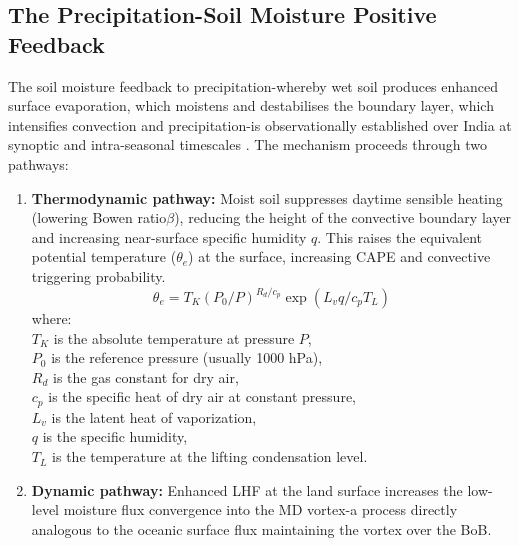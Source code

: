\subsection{The Precipitation-Soil Moisture Positive Feedback}
\label{subsec:precip_sm_feedback}

The soil moisture feedback to precipitation-whereby wet soil produces
enhanced surface evaporation, which moistens and destabilises the
boundary layer, which intensifies convection and precipitation-is
observationally established over India at synoptic and intra-seasonal
timescales \autocite{longterm2025, wei2016impact}.
The mechanism proceeds through two pathways:

\begin{enumerate}
  \item \textbf{Thermodynamic pathway:} Moist soil suppresses daytime
    sensible heating (lowering Bowen ratio$\beta$), reducing the height of the
    convective boundary layer and increasing near-surface specific humidity $q$.
    This raises the equivalent potential temperature ($\theta_e$)
    \autocite{bolton1980computation} at the surface, increasing CAPE and
    convective triggering probability.
    \begin{equation}
      \theta_e = T_K(P_0/P)^{R_d/c_p}\exp(L_v q / c_p T_L)
    \end{equation}
    where:\\
    $T_K$ is the absolute temperature at pressure $P$, \\
    $P_0$ is the reference pressure (usually 1000 hPa), \\
    $R_d$ is the gas constant for dry air, \\
    $c_p$ is the specific heat of dry air at constant pressure, \\
    $L_v$ is the latent heat of vaporization, \\
    $q$ is the specific humidity, \\
    $T_L$ is the temperature at the lifting condensation level.
  \item \textbf{Dynamic pathway:} Enhanced LHF at the land surface
    increases the low-level moisture flux convergence into the MD
    vortex-a process directly analogous to the oceanic surface flux
    maintaining the vortex over the BoB.
\end{enumerate}

